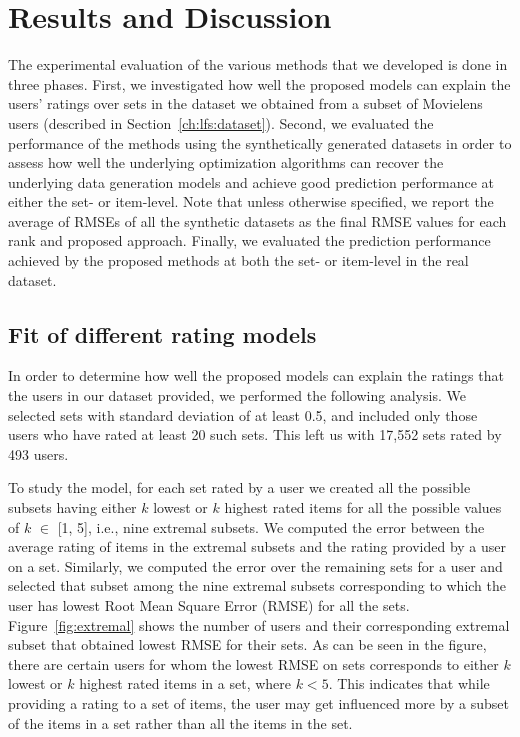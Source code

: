 \section{Results and Discussion} \label{ch:lfs:results}

The experimental evaluation of the various methods that we developed is done in three
phases. First, we investigated how well the proposed models can explain the users' ratings over sets in the dataset we obtained from a subset of Movielens users
(described in Section~\ref{ch:lfs:dataset}). Second, we evaluated the performance of the methods using the synthetically
generated datasets in order to assess how well the underlying optimization algorithms
can recover the underlying data generation models and achieve good prediction
performance at either the set- or item-level. Note that unless otherwise specified,  we report the average of RMSEs of all the
synthetic datasets as the final RMSE values for each rank and proposed approach. Finally, we evaluated the prediction performance achieved by the proposed methods at both the set- or item-level in the real dataset.


\subsection{Fit of different rating models} \label{ch:lfs:fit_rating_model}
In order to determine how well the proposed models can explain the ratings that the
users in our dataset provided, we performed the following analysis. We selected
sets with standard deviation of at least 0.5, and included only those users who
have rated at least 20 such sets. This left us with 17,552 sets rated by 493
users.

To study the \ES model, for each set rated
by a user we created all the possible subsets having either $k$ lowest or $k$
highest rated items for all the possible values of $k$ $\in$ [1, 5], i.e., nine
extremal subsets.
We computed the error between the average rating of items in the extremal
subsets and the rating provided by a user on a set. Similarly, we computed the
error over the remaining sets for a user and selected that subset among the nine
extremal subsets corresponding to which the user has lowest Root Mean Square
Error (RMSE) for all the sets.
Figure~\ref{fig:extremal} shows the number of users and their corresponding
extremal subset that obtained lowest RMSE for their sets. As can be seen in the
figure, there are certain users for whom the
lowest RMSE on sets corresponds to either $k$ lowest or $k$ highest rated items in a set,
where $k < 5$. This indicates that while providing a rating to a set of items, the user may get
influenced more by a subset of the items in a set rather than  all the items in
the set.


